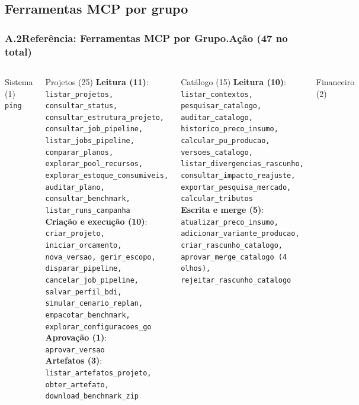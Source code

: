 \documentclass[aspectratio=169,10pt]{beamer}
\begin{document}
\subsection{Ferramentas MCP por grupo}
\begin{frame}
  \frametitle{\textcolor{mlorange}{A.2}\quad Referência: Ferramentas MCP por Grupo.Ação (47 no total)}
  \begin{columns}[T]
    \begin{block}{\tiny Sistema (1)}
      \tiny\texttt{ping}
    \end{block}
    \vspace{1pt}
    \begin{block}{\tiny Projetos (25)}
      \tiny
      \textbf{Leitura (11)}:
      \texttt{listar\_projetos, consultar\_status,
      consultar\_estrutura\_projeto, consultar\_job\_pipeline,
      listar\_jobs\_pipeline, comparar\_planos, explorar\_pool\_recursos,
      explorar\_estoque\_consumiveis, auditar\_plano, consultar\_benchmark,
      listar\_runs\_campanha}\\[3pt]
      \textbf{Criação e execução (10)}:
      \texttt{criar\_projeto, iniciar\_orcamento, nova\_versao,
      gerir\_escopo, disparar\_pipeline, cancelar\_job\_pipeline,
      salvar\_perfil\_bdi, simular\_cenario\_replan, empacotar\_benchmark,
      explorar\_configuracoes\_go}\\[3pt]
      \textbf{Aprovação (1)}: \texttt{aprovar\_versao}\\[3pt]
      \textbf{Artefatos (3)}:
      \texttt{listar\_artefatos\_projeto, obter\_artefato,
      download\_benchmark\_zip}
    \end{block}
    \begin{block}{\tiny\textcolor{mlteal}{Catálogo} (15)}
      \tiny
      \textbf{Leitura (10)}:
      \texttt{listar\_contextos, pesquisar\_catalogo,
      auditar\_catalogo, historico\_preco\_insumo, calcular\_pu\_producao,
      versoes\_catalogo, listar\_divergencias\_rascunho,
      consultar\_impacto\_reajuste, exportar\_pesquisa\_mercado,
      calcular\_tributos}\\[3pt]
      \textbf{Escrita e merge (5)}:
      \texttt{atualizar\_preco\_insumo, adicionar\_variante\_producao,
      criar\_rascunho\_catalogo, aprovar\_merge\_catalogo (4 olhos),
      rejeitar\_rascunho\_catalogo}
    \end{block}
    \vspace{1pt}
    \begin{block}{\tiny\textcolor{mlgreen}{Financeiro} (2)}

\end{block}
\end{columns}
\end{frame}
\end{document}
